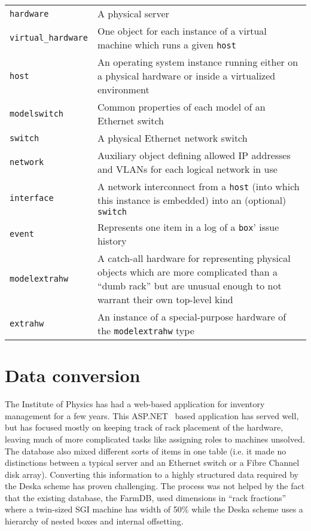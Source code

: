 \documentclass[deska]{subfiles}
\begin{document}
\begin{longtable}{ l | p{10cm}}
    {\tt hardware} & A physical server \\
    {\tt virtual\_hardware} & One object for each instance of a virtual machine which runs a given {\tt host} \\
    {\tt host} & An operating system instance running either on a physical hardware or inside a virtualized environment
    \\
    {\tt modelswitch} & Common properties of each model of an Ethernet switch \\
    {\tt switch } & A physical Ethernet network switch \\
    {\tt network} & Auxiliary object defining allowed IP addresses and VLANs for each logical network in use \\
    {\tt interface} & A network interconnect from a {\tt host} (into which this instance is embedded) into an (optional)
    {\tt switch} \\
    {\tt event} & Represents one item in a log of a {\tt box}' issue history \\
    {\tt modelextrahw} & A catch-all hardware for representing physical objects which are more complicated than a
    ``dumb rack'' but are unusual enough to not warrant their own top-level kind \\
    {\tt extrahw} & An instance of a special-purpose hardware of the {\tt modelextrahw} type
\end{longtable}

\section{Data conversion}
\label{sec:fzu-farmdb}

The Institute of Physics has had a web-based application for inventory management for a few years.  This
ASP.NET~\cite{asp.net} based application has served well, but has focused mostly on keeping track of rack placement of
the hardware, leaving much of more complicated tasks like assigning roles to machines unsolved.  The database also mixed
different sorts of items in one table (i.e. it made no distinctions between a typical server and an Ethernet switch or a
Fibre Channel disk array).  Converting this information to a highly structured data required by the Deska scheme has
proven challenging.  The process was not helped by the fact that the existing database, the FarmDB, used dimensions in
``rack fractions'' where a twin-sized SGI machine has width of 50\% while the Deska scheme uses a hierarchy of nested
boxes and internal offsetting.
\end{document}
